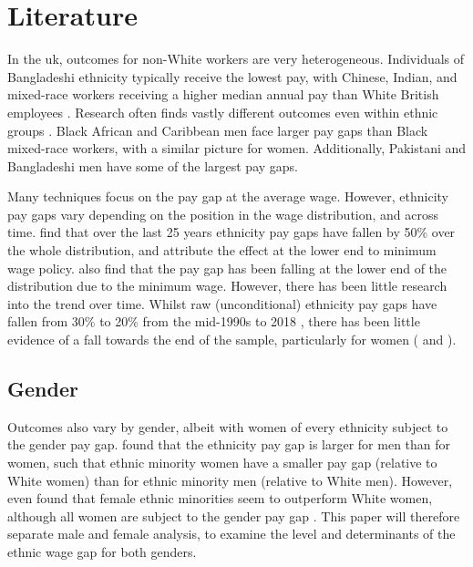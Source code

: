 \documentclass[class=article, crop=false]{standalone}
\begin{document}
\section{Literature}
\label{sec:Literature}
In the \acrshort{uk}, outcomes for non-White workers are very heterogeneous. Individuals of Bangladeshi ethnicity typically receive the lowest pay, with Chinese, Indian, and mixed-race workers receiving a higher median annual pay than White British employees \citep{ONSe}. Research often finds vastly different outcomes even within ethnic groups \citep{Heath}. Black African and Caribbean men face larger pay gaps than Black mixed-race workers, with a similar picture for women. Additionally, Pakistani and Bangladeshi men have some of the largest pay gaps. %

Many techniques focus on the pay gap at the average wage. However, ethnicity pay gaps vary depending on the position in the wage distribution, and across time. \citet{BoE} find that over the last 25 years ethnicity pay gaps have fallen by 50\% over the whole distribution, and attribute the effect at the lower end to minimum wage policy. \citet{Gove} also find that the pay gap has been falling at the lower end of the distribution due to the minimum wage. However, there has been little research into the trend over time. Whilst raw (unconditional) ethnicity pay gaps have fallen from 30\% to 20\% from the mid-1990s to 2018 \cite[p.~11]{BoE}, there has been little evidence of a fall towards the end of the sample, particularly for women (\citet{Metcalf} and \citet{Blackaby}).

\subsection{Gender}
\label{sec:Gender}
Outcomes also vary by gender, albeit with women of every ethnicity subject to the gender pay gap. \citet{Longhi3} found that the ethnicity pay gap is larger for men than for women, such that ethnic minority women have a smaller pay gap (relative to White women) than for ethnic minority men (relative to White men). However, \citet{Metcalf} even found that female ethnic minorities seem to outperform White women, although all women are subject to the gender pay gap \citep{Heath}. This paper will therefore separate male and female analysis, to examine the level and determinants of the ethnic wage gap for both genders.

\end{document}
